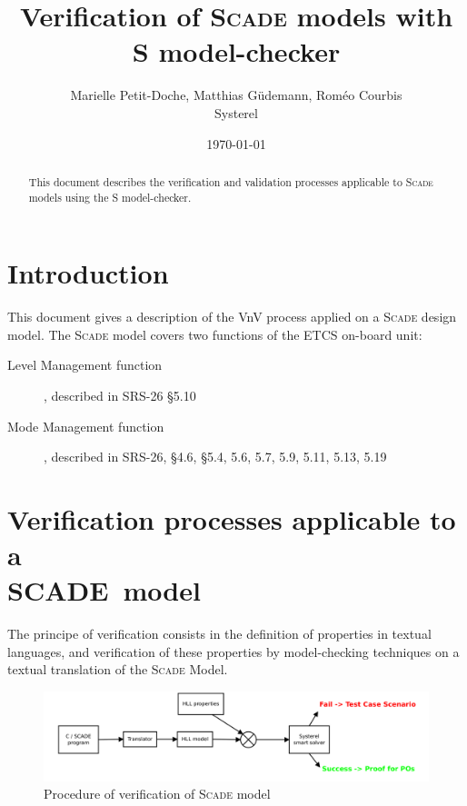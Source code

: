 \documentclass{article}
\newcommand{\smartsolver}{\mbox{S\textsmaller[1]{3}}\xspace}
\newcommand{\SCADE}{\textsc{Scade}}
\begin{document}
\title{Verification of \SCADE{} models with \smartsolver{} model-checker}
\author{Marielle Petit-Doche, Matthias Güdemann, Roméo Courbis\\Systerel}
\date{\today}

\maketitle

\begin{abstract}
This document describes the verification and validation processes applicable to \SCADE{} models using the \smartsolver{} model-checker.
\end{abstract}

\tableofcontents

\newpage

\section{Introduction}

This document gives a description of the VnV process applied on a \SCADE{} design model.
The \SCADE{} model covers two functions of the ETCS on-board unit:
\begin{description}
\item[Level Management function], described in SRS-26 §5.10
\item[Mode Management function], described in SRS-26, §4.6, §5.4, 5.6, 5.7, 5.9, 5.11, 5.13, 5.19
\end{description}

\section{Verification processes applicable to a\\SCADE{}~model}

The principe of verification consists in the definition of properties in textual languages, and verification of these properties by model-checking techniques on a textual translation of the \SCADE{} Model.


\begin{figure}[h!]
\centering
\includegraphics[width=1\textwidth]{S3_process}
\caption{Procedure of verification of \SCADE{} model}
\label{fig:procos}
\end{figure}
\end{document}
